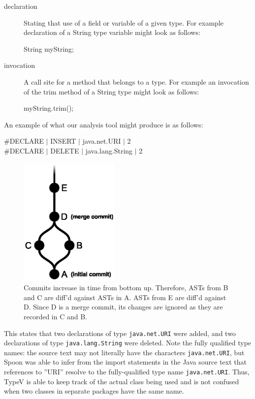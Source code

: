\documentclass[conference]{IEEEtran}
\begin{document}
\begin{description}
\item [declaration] 
  Stating that use of a field or variable of a given type. For example declaration of a String type variable might look as follows:
  \\
  \begin{adjustwidth}{2.5em}{0pt}
  String myString; \\
  \end{adjustwidth}
\item [invocation] 
  A call site for a method that belongs to a type. For example an invocation of the trim method of a String type might look as follows:
  \\
  \begin{adjustwidth}{2.5em}{0pt}
  myString.trim(); \\
  \end{adjustwidth}
\end{description} 

An example of what our analysis tool might produce is as follows:

\begin{adjustwidth}{2.5em}{0pt}
\#DECLARE $\vert$ INSERT $\vert$ java.net.URI $\vert$ 2 \\
\#DECLARE $\vert$ DELETE $\vert$ java.lang.String $\vert$ 2 \\
\end{adjustwidth}

\begin{figure}[!h]
\centering
\includegraphics[height=2.5in]{commits_view}
\caption{Commits increase in time from bottom up. Therefore, ASTs from B and C are diff’d against ASTs in A. ASTs from E are diff’d against D. Since D is a merge commit, its changes are ignored as they are recorded in C and B.}
\label{fig:commits}
\end{figure}

This states that two declarations of type \texttt{java.net.URI} were added, and two declarations of type \texttt{java.lang.String} were deleted. Note the fully qualified type names: the source text may not literally have the characters \texttt{java.net.URI}, but Spoon was able to infer from the import statements in the Java source text that references to ''URI'' resolve to the fully-qualified type name \texttt{java.net.URI}. Thus, TypeV is able to keep track of the actual class being used and is not confused when two classes in separate packages have the same name.
\end{document}
